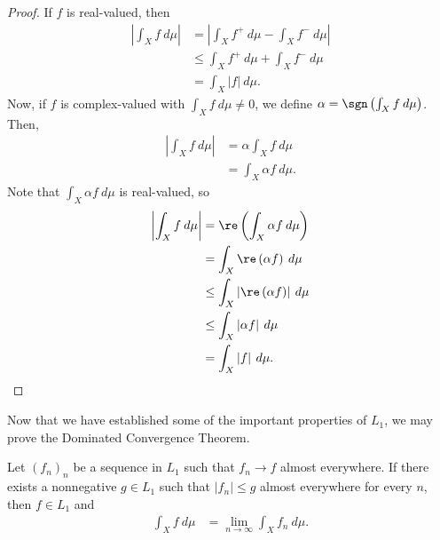 \documentclass[10pt]{mypackage}
\begin{document}
\begin{proof}
  If $f$ is real-valued, then
  \begin{align*}
    \left\vert \int_{X}^{} f\:d\mu \right\vert &= \left\vert \int_{X}^{} f^{+}\:d\mu - \int_{X}^{} f^{-}\:d\mu \right\vert\\
                                               &\leq \int_{X}^{} f^{+}\:d\mu + \int_{X}^{} f^{-}\:d\mu\\
                                               &= \int_{X}^{} \left\vert f \right\vert\:d\mu.
  \end{align*}
  Now, if $f$ is complex-valued with $ \int_{X}^{} f\:d\mu \neq 0 $, we define $\alpha = \sgn\left( \int_{X}^{} f\:d\mu \right)$. Then,
  \begin{align*}
    \left\vert \int_{X}^{} f\:d\mu \right\vert &= \alpha \int_{X}^{} f\:d\mu\\
                                               &= \int_{X}^{} \alpha f\:d\mu.
  \end{align*}
  Note that $ \int_{X}^{} \alpha f\:d\mu $ is real-valued, so
  \begin{align*}
    \left\vert \int_{X}^{} f\:d\mu \right\vert &= \re \left( \int_{X}^{} \alpha f\:d\mu \right)\\
                                               &= \int_{X}^{} \re\left( \alpha f \right)\:d\mu\\
                                               &\leq \int_{X}^{} \left\vert \re\left( \alpha f \right) \right\vert\:d\mu\\
                                               &\leq \int_{X}^{} \left\vert \alpha f \right\vert\:d\mu\\
                                               &= \int_{X}^{} \left\vert f \right\vert\:d\mu.
  \end{align*}
\end{proof}
Now that we have established some of the important properties of $L_1$, we may prove the Dominated Convergence Theorem.
\begin{theorem}
  Let $\left( f_n \right)_n$ be a sequence in $L_1$ such that $f_n\rightarrow f$ almost everywhere. If there exists a nonnegative $g\in L_1$ such that $\left\vert f_n \right\vert \leq g$ almost everywhere for every $n$, then $f\in L_1$ and
  \begin{align*}
    \int_{X}^{} f\:d\mu &= \lim_{n\rightarrow\infty} \int_{X}^{} f_n\:d\mu.
  \end{align*}
\end{theorem}
\end{document}

